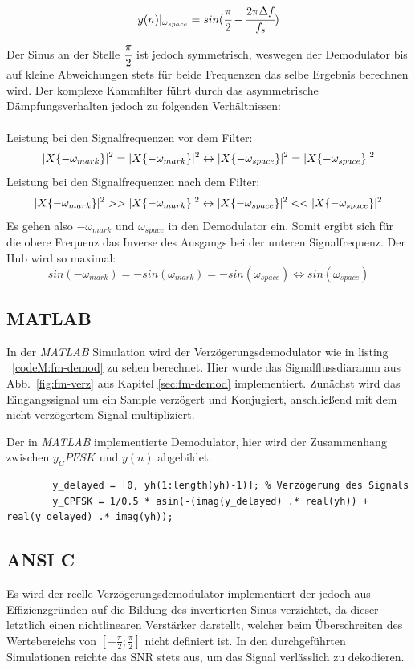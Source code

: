 \documentclass{article}
\begin{document}
$$
y(n)\arrowvert_{\omega_{space}} = sin(\cfrac{\pi}{2}-\cfrac{2 \pi \Delta f}{f_s})
$$
Der Sinus an der Stelle $\cfrac{\pi}{2}$ ist jedoch symmetrisch, weswegen der Demodulator bis auf kleine Abweichungen stets für beide Frequenzen das selbe Ergebnis berechnen wird. Der komplexe Kammfilter führt durch das asymmetrische Dämpfungsverhalten jedoch zu folgenden Verhältnissen:\\\\
Leistung bei den Signalfrequenzen vor dem Filter:
$$
\arrowvert X \{ -\omega_{mark} \} \arrowvert^2 = \arrowvert X \{ -\omega_{mark} \} \arrowvert^2 \leftrightarrow \arrowvert X \{ -\omega_{space} \} \arrowvert^2 = \arrowvert X \{ -\omega_{space} \} \arrowvert^2
$$
Leistung bei den Signalfrequenzen nach dem Filter:
$$
\arrowvert X \{ -\omega_{mark} \} \arrowvert^2 >> \arrowvert X \{ -\omega_{mark} \} \arrowvert^2 \leftrightarrow \arrowvert X \{ -\omega_{space} \} \arrowvert^2 << \arrowvert X \{ -\omega_{space} \} \arrowvert^2
$$
Es gehen also $-\omega_{mark}$ und $\omega_{space}$ in den Demodulator ein.
Somit ergibt sich für die obere Frequenz das Inverse des Ausgangs bei der unteren Signalfrequenz. Der Hub wird so maximal:
$$
sin(-\omega_{mark}) = -sin(\omega_{mark}) = -sin(\omega_{space}) \Longleftrightarrow sin(\omega_{space})
$$
\subsection{MATLAB}
In der \textit{MATLAB} Simulation wird der Verzögerungsdemodulator wie in listing ~\ref{codeM:fm-demod} zu sehen berechnet.
Hier wurde das Signalflussdiaramm aus Abb.~\ref{fig:fm-verz} aus Kapitel \ref{sec:fm-demod} implementiert.
Zunächst wird das Eingangssignal um ein Sample verzögert und Konjugiert, anschließend mit dem nicht verzögertem Signal 
multipliziert.
\begin{listing}\label{codeM:fm-demod}
    \caption{Der in \textit{MATLAB} implementierte Demodulator, hier wird der Zusammenhang zwischen $y_CPFSK$ und $y(n)$ abgebildet.}
    \begin{verbatim}
        y_delayed = [0, yh(1:length(yh)-1)]; % Verzögerung des Signals
        y_CPFSK = 1/0.5 * asin(-(imag(y_delayed) .* real(yh)) + real(y_delayed) .* imag(yh));
    \end{verbatim}
\end{listing}

\subsection{ANSI C}
Es wird der reelle Verzögerungsdemodulator implementiert der jedoch aus Effizienzgründen auf die Bildung des invertierten Sinus verzichtet, da dieser letztlich einen nichtlinearen Verstärker darstellt, welcher beim Überschreiten des Wertebereichs von $[-\frac{\pi}{2};\frac{\pi}{2}]$ nicht definiert ist. In den durchgeführten Simulationen reichte das SNR stets aus, um das Signal verlässlich zu dekodieren.
\end{document}
